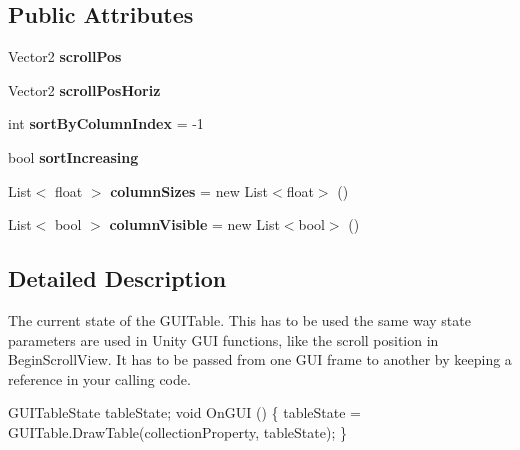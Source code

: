 \subsection*{Public Attributes}
\begin{DoxyCompactItemize}
\item 
\mbox{\label{class_g_u_i_extensions_1_1_g_u_i_table_state_a8f3a30d048d0f19c1cb11451be849c24}} 
Vector2 {\bfseries scroll\+Pos}
\item 
\mbox{\label{class_g_u_i_extensions_1_1_g_u_i_table_state_a28f1555aaef55d4ce9ea3b90d35c780c}} 
Vector2 {\bfseries scroll\+Pos\+Horiz}
\item 
\mbox{\label{class_g_u_i_extensions_1_1_g_u_i_table_state_a8e062485d693d9d8204a8d868221f6a9}} 
int {\bfseries sort\+By\+Column\+Index} = -\/1
\item 
\mbox{\label{class_g_u_i_extensions_1_1_g_u_i_table_state_aa0dd82f8c71eac659a8774d61fd4fbfd}} 
bool {\bfseries sort\+Increasing}
\item 
\mbox{\label{class_g_u_i_extensions_1_1_g_u_i_table_state_a07122241ee02f8d8c31f0908d67f1bd5}} 
List$<$ float $>$ {\bfseries column\+Sizes} = new List$<$float$>$ ()
\item 
\mbox{\label{class_g_u_i_extensions_1_1_g_u_i_table_state_a2612ab7ea11c0a56c961dc4f93470e10}} 
List$<$ bool $>$ {\bfseries column\+Visible} = new List$<$bool$>$ ()
\end{DoxyCompactItemize}


\subsection{Detailed Description}
The current state of the G\+U\+I\+Table. This has to be used the same way state parameters are used in Unity G\+UI functions, like the scroll position in Begin\+Scroll\+View. It has to be passed from one G\+UI frame to another by keeping a reference in your calling code. 


\begin{DoxyCode}
GUITableState tableState;
\textcolor{keywordtype}{void} OnGUI ()
\{
    tableState = GUITable.DrawTable(collectionProperty, tableState);
\}
\end{DoxyCode}
 

